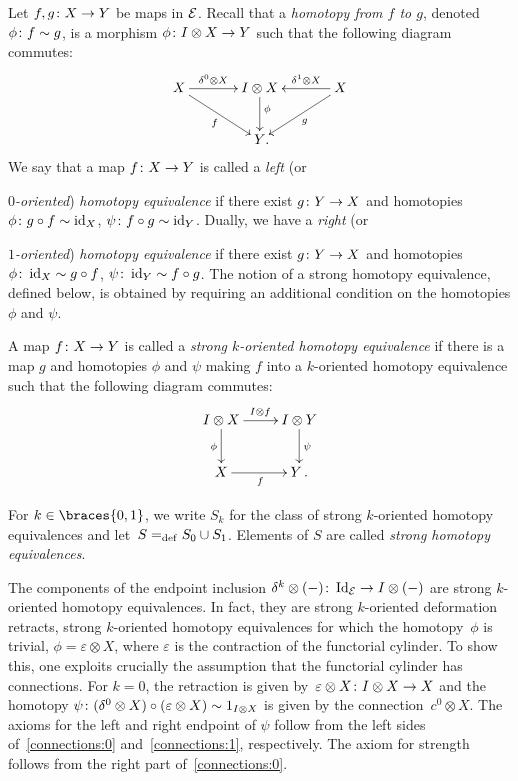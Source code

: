 \documentclass[reqno,10pt,a4paper,oneside,draft]{amsart}
\begin{document}
Let $f, g \colon X \to Y$ be maps in $\mathcal{E}$.
Recall that a \emph{homotopy from $f$ to $g$}, denoted $\phi \colon f \sim g$, is a morphism $\phi \colon I \otimes X \to Y$ such that the following diagram commutes:
\begin{equation} \label{equ:homotopy}
\begin{gathered}
\xymatrix@C=1.2cm{
  X
  \ar[r]^-{\lcyl \otimes X}
  \ar[dr]_{f}
&
  \interval \otimes X
  \ar[d]^(0.4){\phi}
&
  X
  \ar[dl]^{g}
  \ar[l]_-{\rcyl \otimes X}
\\&
  Y
\rlap{.}}
\end{gathered}
\end{equation}
We say that a map $f \colon X \to Y$ is called a \emph{left} (or {\emph{$0$-oriented}) \emph{homotopy equivalence} if there exist $g \colon Y \to X$ and homotopies $\phi \colon g \mathbin{\circ} f \sim \operatorname{id}_X $, $\psi \colon f \mathbin{\circ} g \sim \operatorname{id}_Y$.
Dually, we have a \emph{right} (or {\emph{ $1$-oriented}) \emph{homotopy equivalence} if there exist $g \colon Y \to X$ and homotopies  $\phi \colon \operatorname{id}_X \sim g \mathbin{\circ} f$, $\psi \colon \operatorname{id}_Y \sim f \mathbin{\circ} g$.  The notion of a strong
homotopy equivalence, defined below, is obtained by requiring an additional condition on the homotopies $\phi$ and $\psi$. 



\begin{definition} \label{def:strhe}
A map $f \colon X \to Y$ is called a \emph{strong $k$-oriented homotopy equivalence} if there is a map $g$ and homotopies $\phi$ and $\psi$ making $f$ into a
$k$-oriented homotopy equivalence such that the following diagram commutes:
\[
\xymatrix{
  \interval \otimes X
  \ar[r]^{\interval \otimes f}
  \ar[d]_{\phi}
&
  \interval \otimes Y
  \ar[d]^{\psi}
\\
  X
  \ar[r]_{f}
&
  Y \, . 
}
\]
\end{definition}

For $k \in \braces{0, 1}$, we write $S_k$ for the class of strong $k$-oriented homotopy equivalences and let~$S =_{\operatorname{def}} S_0 \cup S_1$.
Elements of $S$ are called \emph{strong homotopy equivalences}. 

\begin{remark}  \label{thm:endpoint-are-she}
The components of the endpoint 
inclusion $\delta^k \otimes (-) \colon \operatorname{Id}_{\mathcal{E}} \to I \otimes (-)$
are strong $k$-oriented homotopy equivalences. In fact, they are 
strong $k$-oriented deformation retracts, \ie strong $k$-oriented homotopy equivalences for which 
the homotopy~$\phi$ is trivial, \ie  $\phi = \varepsilon \otimes X$, where $\varepsilon$ is the contraction of the functorial cylinder. 
To show this, one exploits crucially the assumption that the functorial cylinder has
connections. For $k = 0$, the retraction is given by~$\varepsilon \otimes X \colon I \otimes X \to X$ and the homotopy 
$\psi \colon (\delta^0 \otimes X) \circ (\varepsilon \otimes X)  \sim 
1_{I \otimes X}$ is given by the connection~$c^0 \otimes X$. 
The axioms for the left and right endpoint of $\psi$ follow from the left sides of~\eqref{connections:0} and~\eqref{connections:1}, respectively.
The axiom for strength follows from the right part of~\eqref{connections:0}. 
\end{remark}




}}
\end{document}
